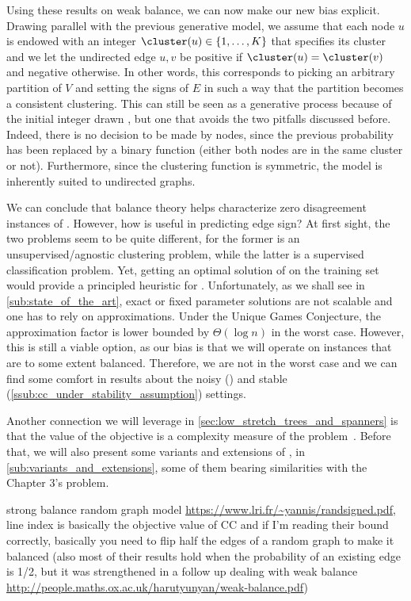 Using these results on weak balance, we can now make our new bias explicit. Drawing parallel with
the previous generative model, we assume that each node $u$ is endowed with an integer $\cluster(u)
\in \{1, \ldots, K\}$ that specifies its cluster and we let the undirected edge $u,v$ be positive if
$\cluster(u) = \cluster(v)$ and negative otherwise. In other words, this corresponds to picking an
arbitrary partition of $V$ and setting the signs of $E$ in such a way that the partition becomes a
consistent clustering. This can still be seen as a generative process because of the initial integer
drawn \uar{}, but one that
avoids the two pitfalls discussed before. Indeed, there is no decision to be made by nodes, since
the previous probability has been replaced by a binary function (either both nodes are in the same
cluster or not). Furthermore, since the clustering function is symmetric, the model is inherently
suited to undirected graphs.

\iffalse
We can conclude that balance theory helps characterize zero disagreement instances of \pcc{}.
However, how is \pcc{} useful in predicting edge sign? At first sight, the two problems seem to be quite
different, for the former is an unsupervised/agnostic clustering problem, while the latter is a
supervised classification problem. Yet, getting an optimal solution of \pcc{} on the training set
would provide a principled heuristic for \esp{}. Unfortunately, as we shall see in
\autoref{sub:state_of_the_art}, exact or fixed parameter solutions are not scalable and one has to
rely on approximations. Under the Unique Games Conjecture, the approximation factor is lower bounded by
$\Theta(\log n)$ in the worst case. However, this is still a viable option, as our bias is that we
will operate on instances that are to some extent balanced. Therefore, we are not in the worst case
and we can find some comfort in results about the noisy () and
stable (\autoref{ssub:cc_under_stability_assumption}) settings.

Another connection we will leverage in \autoref{sec:low_stretch_trees_and_spanners} is that the
value of the \mind{} objective is a complexity measure of the \esp{} problem~\autocite[Section
4.1]{Cesa-Bianchi2012b}. Before that, we will also present some variants and extensions of \pcc{},
in \autoref{sub:variants_and_extensions}, some of them bearing similarities with the Chapter 3's problem.

strong balance random graph model \url{https://www.lri.fr/~yannis/randsigned.pdf}, line index is basically
the objective value of CC and if I'm reading their bound correctly,  basically you need to flip half
the edges of a random graph to make it balanced (also most of their results hold when the
probability of an existing edge is 1/2, but it was strengthened in a follow up dealing with weak
balance \url{http://people.maths.ox.ac.uk/harutyunyan/weak-balance.pdf})

